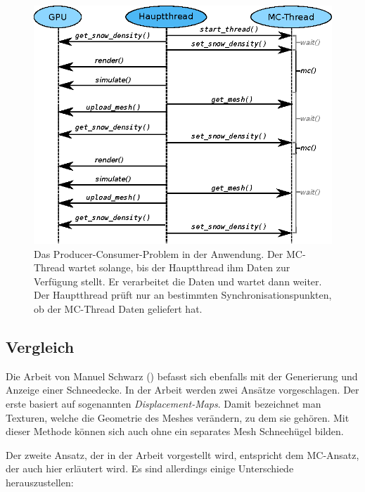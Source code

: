 \begin{figure}[h]
\centering
\includegraphics[width=12cm]{images/producer_consumer}
\caption{Das Producer-Consumer-Problem in der Anwendung. Der MC-Thread wartet solange, bis der Hauptthread ihm Daten zur Verfügung stellt. Er verarbeitet die Daten und wartet dann weiter. Der Hauptthread prüft nur an bestimmten Synchronisationspunkten, ob der MC-Thread Daten geliefert hat.}
\label{fig:implementation_fallen_snow_producer_consumer}
\end{figure}

\subsection{Vergleich}

Die Arbeit von Manuel Schwarz (\cite{Schwarz2012}) befasst sich
ebenfalls mit der Generierung und Anzeige einer Schneedecke. In der
Arbeit werden zwei Ansätze vorgeschlagen. Der erste basiert auf
sogenannten \emph{Displacement-Maps}. Damit bezeichnet man Texturen,
welche die Geometrie des Meshes verändern, zu dem sie gehören. Mit
dieser Methode können sich auch ohne ein separates Mesh Schneehügel
bilden.

Der zweite Ansatz, der in der Arbeit vorgestellt wird, entspricht dem
MC-Ansatz, der auch hier erläutert wird. Es sind allerdings
einige Unterschiede herauszustellen:

